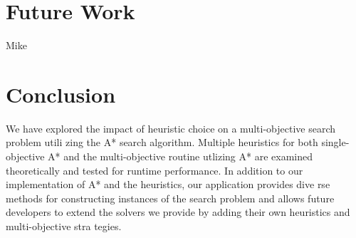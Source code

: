 \documentclass[12pt, conference, compsocconf]{IEEEtran}
\begin{document}
\section{Future Work}
Mike

\section{Conclusion}
We have explored the impact of heuristic choice on a multi-objective search problem utili
zing the A* search algorithm.
Multiple heuristics for both single-objective A* and the multi-objective routine utlizing A* are examined theoretically and tested for runtime performance.
In addition to our implementation of A* and the heuristics, our application provides dive
rse methods for constructing instances of the search problem and allows future developers
 to extend the solvers we provide by adding their own heuristics and multi-objective stra
tegies.




\end{document}
